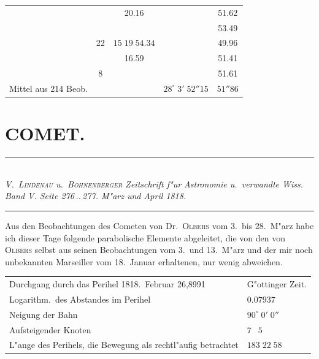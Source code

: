 \documentclass[12pt,a4paper]{article}
\begin{document}
\begin{center}
\begin{tabular}{c|c|c|c|c}
\phantom{13} & & \phantom{0}\phantom{0}\phantom{0}20.16 & & \phantom{0}\phantom{0}\phantom{0}\phantom{0}\phantom{0}51.62 \\
\phantom{13} & & & & \phantom{0}\phantom{0}\phantom{0}\phantom{0}\phantom{0}53.49 \\
\phantom{13} & 22 & \phantom{0}\phantom{0}$15\;19\;54.34$ & & \phantom{0}\phantom{0}\phantom{0}\phantom{0}\phantom{0}49.96 \\
\phantom{13} & & \phantom{0}\phantom{0}\phantom{0}16.59 & & \phantom{0}\phantom{0}\phantom{0}\phantom{0}\phantom{0}51.41 \\
\phantom{13} & \phantom{0}8 & & & \phantom{0}\phantom{0}\phantom{0}\phantom{0}\phantom{0}51.61 \\
\midrule
Mittel aus 214 Beob. & & & $28^{\circ}\;3'\;52''15$ & $51''86$ \\
\bottomrule
\end{tabular}
\end{center}

\newpage

\section*{COMET.}

\begin{center}
\rule{0.6\textwidth}{0.4pt}\\[0.5em]
\textit{V.~\textsc{Lindenau} u.~\textsc{Bohnenberger} Zeitschrift f"ur Astronomie u.~verwandte Wiss.}\\
\textit{Band V. Seite 276\,..\,277. M"arz und April 1818.}\\[0.3em]
\rule{0.6\textwidth}{0.4pt}
\end{center}

Aus den Beobachtungen des Cometen von Dr.~\textsc{Olbers} vom 3.~bis 28.~M"arz habe ich dieser Tage
folgende parabolische Elemente abgeleitet, die von den von \textsc{Olbers} selbst aus seinen Beobachtungen
vom 3.~und 13.~M"arz und der mir noch unbekannten Marseiller vom 18.~Januar erhaltenen, nur wenig
abweichen.

\begin{center}
\begin{tabular}{l@{\dotfill}l}
Durchgang durch das Perihel 1818.~Februar 26,8991 & G"ottinger Zeit. \\
Logarithm.~des Abstandes im Perihel & $0.07937$ \\
Neigung der Bahn & $90^{\circ}\;0'\;0''$ \\
Aufsteigender Knoten & $7\;\phantom{0}5\;\phantom{0}\phantom{0}\phantom{0}$ \\
L"ange des Perihels, die Bewegung als rechtl"aufig betrachtet & $183\;22\;58$ \\
\end{tabular}
\end{center}
\end{document}
